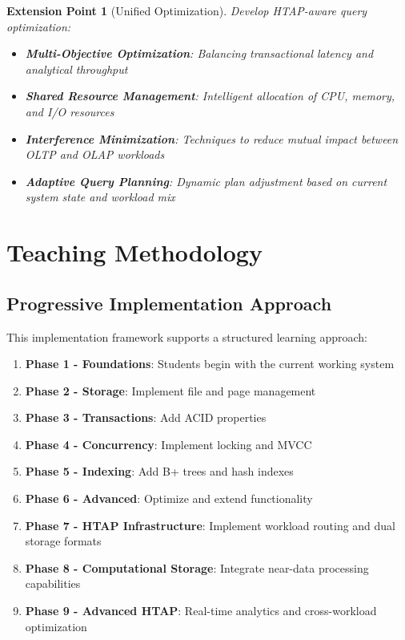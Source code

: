 \documentclass[12pt,a4paper]{article}
\newtheorem{extension}{Extension Point}[section]
\begin{document}
    \begin{extension}[Unified Optimization]
        Develop HTAP-aware query optimization:

        \begin{itemize}
            \item \textbf{Multi-Objective Optimization}: Balancing transactional latency and analytical throughput
            \item \textbf{Shared Resource Management}: Intelligent allocation of CPU, memory, and I/O resources
            \item \textbf{Interference Minimization}: Techniques to reduce mutual impact between OLTP and OLAP workloads
            \item \textbf{Adaptive Query Planning}: Dynamic plan adjustment based on current system state and workload mix
        \end{itemize}
    \end{extension}

    \section{Teaching Methodology}

    \subsection{Progressive Implementation Approach}

    This implementation framework supports a structured learning approach:

    \begin{enumerate}
        \item \textbf{Phase 1 - Foundations}: Students begin with the current working system
        \item \textbf{Phase 2 - Storage}: Implement file and page management
        \item \textbf{Phase 3 - Transactions}: Add ACID properties
        \item \textbf{Phase 4 - Concurrency}: Implement locking and MVCC
        \item \textbf{Phase 5 - Indexing}: Add B+ trees and hash indexes
        \item \textbf{Phase 6 - Advanced}: Optimize and extend functionality
        \item \textbf{Phase 7 - HTAP Infrastructure}: Implement workload routing and dual storage formats
        \item \textbf{Phase 8 - Computational Storage}: Integrate near-data processing capabilities
        \item \textbf{Phase 9 - Advanced HTAP}: Real-time analytics and cross-workload optimization
    \end{enumerate}
\end{document}

